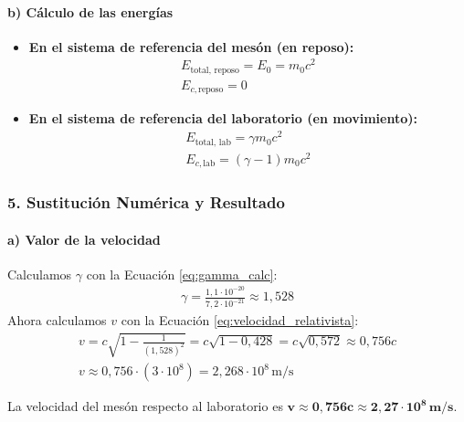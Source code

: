 \paragraph*{b) Cálculo de las energías}
\begin{itemize}
    \item \textbf{En el sistema de referencia del mesón (en reposo):}
    \begin{gather}
        E_{\text{total, reposo}} = E_0 = m_0 c^2 \\
        E_{c, \text{reposo}} = 0
    \end{gather}
    \item \textbf{En el sistema de referencia del laboratorio (en movimiento):}
    \begin{gather}
        E_{\text{total, lab}} = \gamma m_0 c^2 \\
        E_{c, \text{lab}} = (\gamma - 1) m_0 c^2
    \end{gather}
\end{itemize}

\subsubsection*{5. Sustitución Numérica y Resultado}
\paragraph*{a) Valor de la velocidad}
Calculamos $\gamma$ con la Ecuación \ref{eq:gamma_calc}:
\begin{gather}
    \gamma = \frac{1,1 \cdot 10^{-20}}{7,2 \cdot 10^{-21}} \approx 1,528
\end{gather}
Ahora calculamos $v$ con la Ecuación \ref{eq:velocidad_relativista}:
\begin{gather}
    v = c \sqrt{1 - \frac{1}{(1,528)^2}} = c \sqrt{1 - 0,428} = c \sqrt{0,572} \approx 0,756 c \nonumber \\
    v \approx 0,756 \cdot (3 \cdot 10^8) = 2,268 \cdot 10^8 \, \text{m/s}
\end{gather}
\begin{cajaresultado}
    La velocidad del mesón respecto al laboratorio es $\boldsymbol{v \approx 0,756c \approx 2,27 \cdot 10^8 \, \textbf{m/s}}$.
\end{cajaresultado}


